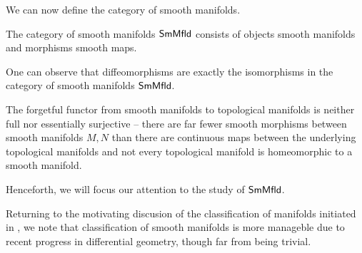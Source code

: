 We can now define the category of smooth manifolds. 
\begin{definition}\label{def: category of smooth manifolds}
    The category of smooth manifolds $\mathsf{SmMfld}$ consists of objects smooth manifolds and morphisms smooth maps. 
\end{definition}
\begin{remark}
    One can observe that diffeomorphisms are exactly the isomorphisms in the category of smooth manifolds $\mathsf{SmMfld}$. 
\end{remark}
\begin{remark}
    The forgetful functor from smooth manifolds to topological manifolds is neither full nor essentially surjective -- there are far fewer smooth morphisms between smooth manifolds $M,N$ than there are continuous maps between the underlying topological manifolds and not every topological manifold is homeomorphic to a smooth manifold. 
\end{remark}
Henceforth, we will focus our attention to the study of $\mathsf{SmMfld}$. 

\begin{remark}
    Returning to the motivating discusion of the classification of manifolds initiated in , we note that classification of smooth manifolds is more manageble due to recent progress in differential geometry, though far from being trivial. 
\end{remark}